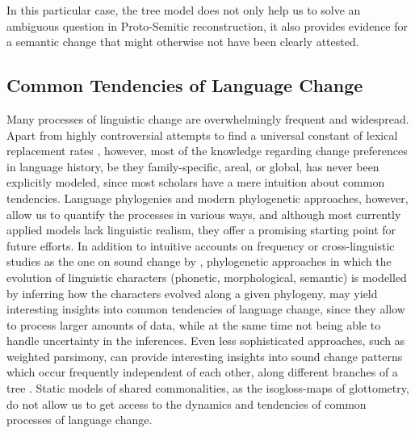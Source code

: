 \documentclass[svgnames,12pt]{scrartcl}
\begin{document}
{{In this particular case, the tree model does not only help us to solve an ambiguous question in
Proto-Semitic reconstruction, it also provides evidence for a semantic change that might otherwise
not have been clearly attested.

 
\subsection{Common Tendencies of Language Change}
Many processes of linguistic change are overwhelmingly frequent and widespread. Apart from highly
controversial attempts to find a universal constant of lexical replacement rates
\citep{Swadesh1955}, however, most of the knowledge regarding change preferences in language
history, be they family-specific, areal, or global, has never been explicitly modeled, since most
scholars have a mere intuition about common tendencies.  Language phylogenies and modern
phylogenetic approaches, however, allow us to quantify the processes in various ways, and although
most currently applied models lack linguistic realism, they offer a promising starting point for
future efforts. In addition to intuitive accounts on frequency or cross-linguistic studies as the
one on sound change by \citet{kuemmel07wandel}, phylogenetic approaches in which the evolution of
linguistic characters (phonetic, morphological, semantic) is modelled by inferring how the
characters evolved along a given phylogeny, may yield interesting insights into common tendencies of
language change, since they allow to process larger amounts of data, while at the same time not
being able to handle uncertainty in the inferences. Even less sophisticated approaches, such as
weighted parsimony, can provide interesting insights into sound change patterns which occur
frequently independent of each other, along different branches of a tree \citep{Chacon2015a}. Static
models of shared commonalities, as the isogloss-maps of glottometry, do not allow us to get access
to the dynamics and tendencies of common processes of language change.
 
}}
\end{document}
